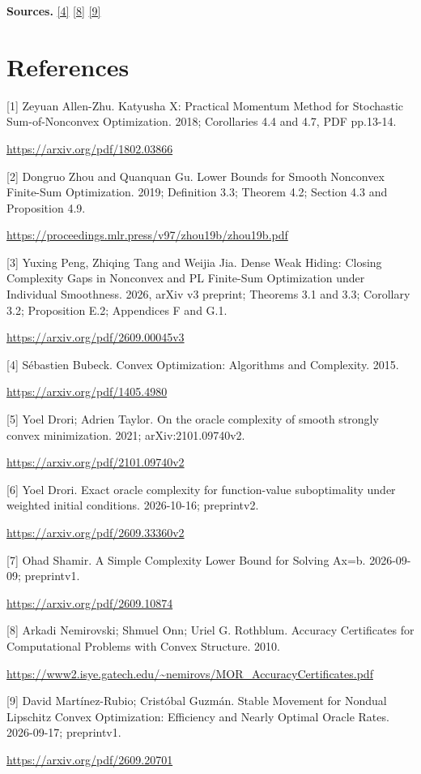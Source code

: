 \documentclass[10pt,a4paper]{article}
\begin{document}
\textbf{Sources.} \href{https://arxiv.org/pdf/1405.4980}{[4]} \href{https://www2.isye.gatech.edu/~nemirovs/MOR_AccuracyCertificates.pdf}{[8]} \href{https://arxiv.org/pdf/2609.20701}{[9]}

\section{References}
[1] Zeyuan Allen-Zhu. Katyusha X: Practical Momentum Method for Stochastic Sum-of-Nonconvex Optimization. 2018; Corollaries 4.4 and 4.7, PDF pp.13-14.

\url{https://arxiv.org/pdf/1802.03866}

[2] Dongruo Zhou and Quanquan Gu. Lower Bounds for Smooth Nonconvex Finite-Sum Optimization. 2019; Definition 3.3; Theorem 4.2; Section 4.3 and Proposition 4.9.

\url{https://proceedings.mlr.press/v97/zhou19b/zhou19b.pdf}

[3] Yuxing Peng, Zhiqing Tang and Weijia Jia. Dense Weak Hiding: Closing Complexity Gaps in Nonconvex and PL Finite-Sum Optimization under Individual Smoothness. 2026, arXiv v3 preprint; Theorems 3.1 and 3.3; Corollary 3.2; Proposition E.2; Appendices F and G.1.

\url{https://arxiv.org/pdf/2609.00045v3}

[4] Sébastien Bubeck. Convex Optimization: Algorithms and Complexity. 2015.

\url{https://arxiv.org/pdf/1405.4980}

[5] Yoel Drori; Adrien Taylor. On the oracle complexity of smooth strongly convex minimization. 2021; arXiv:2101.09740v2.

\url{https://arxiv.org/pdf/2101.09740v2}

[6] Yoel Drori. Exact oracle complexity for function-value suboptimality under weighted initial conditions. 2026-10-16; preprintv2.

\url{https://arxiv.org/pdf/2609.33360v2}

[7] Ohad Shamir. A Simple Complexity Lower Bound for Solving Ax=b. 2026-09-09; preprintv1.

\url{https://arxiv.org/pdf/2609.10874}

[8] Arkadi Nemirovski; Shmuel Onn; Uriel G. Rothblum. Accuracy Certificates for Computational Problems with Convex Structure. 2010.

\url{https://www2.isye.gatech.edu/~nemirovs/MOR_AccuracyCertificates.pdf}

[9] David Martínez-Rubio; Cristóbal Guzmán. Stable Movement for Nondual Lipschitz Convex Optimization: Efficiency and Nearly Optimal Oracle Rates. 2026-09-17; preprintv1.

\url{https://arxiv.org/pdf/2609.20701}
\end{document}
